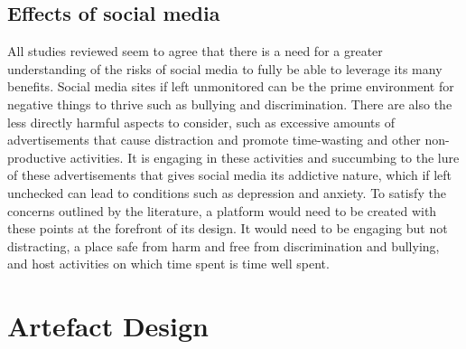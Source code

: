 \documentclass[lettersize,journal]{IEEEtran}
\begin{document}
        \subsection{Effects of social media}
        All studies reviewed seem to agree that there is a need for a greater understanding of the risks of social media to fully
         be able to leverage its many benefits. Social media sites if left unmonitored can be the prime environment for negative things to thrive
         such as bullying and discrimination. There are also the less directly harmful aspects to consider, such as excessive amounts of advertisements that
         cause distraction and promote time-wasting and other non-productive activities. It is engaging in these activities and succumbing to the lure of
         these advertisements that gives social media its addictive nature, which if left unchecked can lead to conditions such as depression and anxiety.
         To satisfy the concerns outlined by the literature, a platform would need to be created with these points at the forefront of its design.
         It would need to be engaging but not distracting, a place safe from harm and free from discrimination and bullying, and host activities on
         which time spent is time well spent.





\section{Artefact Design}
\end{document}
